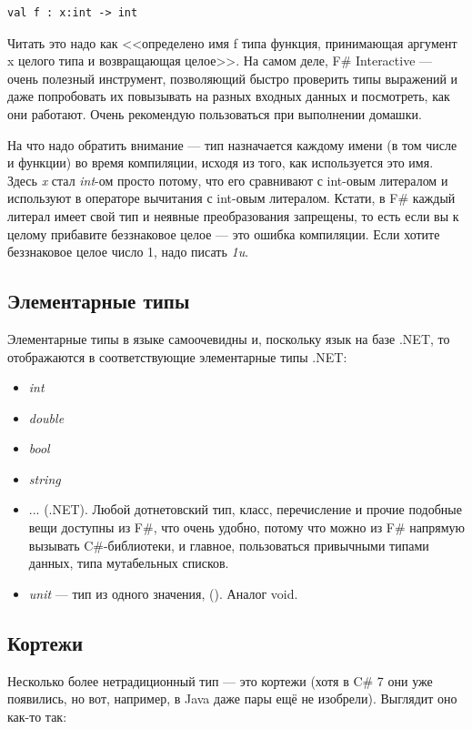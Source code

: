 \documentclass{../../text-style}
\begin{document}
\begin{verbatim}
val f : x:int -> int
\end{verbatim}

Читать это надо как <<определено имя f типа функция, принимающая аргумент x целого типа и возвращающая целое>>. На самом деле, F\# Interactive --- очень полезный инструмент, позволяющий быстро проверить типы выражений и даже попробовать их повызывать на разных входных данных и посмотреть, как они работают. Очень рекомендую пользоваться при выполнении домашки.

На что надо обратить внимание --- тип назначается каждому имени (в том числе и функции) во время компиляции, исходя из того, как используется это имя. Здесь \textit{x} стал \textit{int}-ом просто потому, что его сравнивают с int-овым литералом и используют в операторе вычитания с int-овым литералом. Кстати, в F\# каждый литерал имеет свой тип и неявные преобразования запрещены, то есть если вы к целому прибавите беззнаковое целое --- это ошибка компиляции. Если хотите беззнаковое целое число 1, надо писать \textit{1u}.

\subsection{Элементарные типы}

Элементарные типы в языке самоочевидны и, поскольку язык на базе .NET, то отображаются в соответствующие элементарные типы .NET:

\begin{itemize}
    \item \textit{int}
    \item \textit{double}
    \item \textit{bool}
    \item \textit{string}
    \item ... (.NET). Любой дотнетовский тип, класс, перечисление и прочие подобные вещи доступны из F\#, что очень удобно, потому что можно из F\# напрямую вызывать C\#-библиотеки, и главное, пользоваться привычными типами данных, типа мутабельных списков.
    \item \textit{unit} --- тип из одного значения, (). Аналог void.
\end{itemize}

\subsection{Кортежи}

Несколько более нетрадиционный тип --- это кортежи (хотя в C\# 7 они уже появились, но вот, например, в Java даже пары ещё не изобрели). Выглядит оно как-то так:
\end{document}
